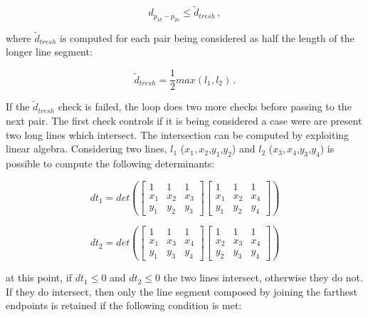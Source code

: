\begin{equation}
  d_{p_{1b}-p_{2a}} \leqslant \tilde{d}_{tresh} \,,
\end{equation}

where $\tilde{d}_{tresh}$ is computed for each pair being considered as half the length of the longer line segment:

\begin{equation}
  \tilde{d}_{tresh} = {\frac{1}{2}} max(l_1, l_2) \,.
\end{equation}

If the $\tilde{d}_{tresh}$ check is failed, the loop does two more checks before passing to the next pair. The first check controls if it is being considered a case were are present two long lines which intersect. The intersection can be computed by exploiting linear algebra. Considering two lines, $l_1$ ($x_1,x_2$,$y_1$,$y_2$) and $l_2$ ($x_3,x_4$,$y_3$,$y_4$) is possible to compute the following determinants:

\begin{equation}
  dt_1 = det \left(
  \begin{bmatrix}
      1   & 1   & 1   \\
      x_1 & x_2 & x_3 \\
      y_1 & y_2 & y_3
    \end{bmatrix}
  \begin{bmatrix}
      1   & 1   & 1   \\
      x_1 & x_2 & x_4 \\
      y_1 & y_2 & y_4
    \end{bmatrix}
  \right)
\end{equation}

\begin{equation}
  dt_2 = det \left(
  \begin{bmatrix}
      1   & 1   & 1   \\
      x_1 & x_3 & x_4 \\
      y_1 & y_3 & y_4
    \end{bmatrix}
  \begin{bmatrix}
      1   & 1   & 1   \\
      x_2 & x_3 & x_4 \\
      y_2 & y_3 & y_4
    \end{bmatrix}
  \right)
\end{equation}

at this point, if $dt_1  \leqslant 0$ and $dt_2  \leqslant 0$ the two lines intersect, otherwise they do not.
If they do intersect, then only the line segment composed by joining the farthest endpoints is retained if the following condition is met:

